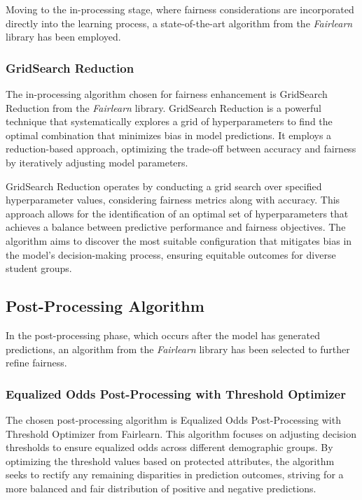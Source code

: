 \documentclass[12pt,a4paper,openright,twoside]{book}
\begin{document}
Moving to the in-processing stage, where fairness considerations are incorporated directly into the learning process, a state-of-the-art algorithm from the \emph{Fairlearn} library has been employed.

\subsubsection{GridSearch Reduction}

The in-processing algorithm chosen for fairness enhancement is GridSearch Reduction from the \emph{Fairlearn} library. GridSearch Reduction is a powerful technique that systematically explores a grid of hyperparameters to find the optimal combination that minimizes bias in model predictions. It employs a reduction-based approach, optimizing the trade-off between accuracy and fairness by iteratively adjusting model parameters.

GridSearch Reduction operates by conducting a grid search over specified hyperparameter values, considering fairness metrics along with accuracy. This approach allows for the identification of an optimal set of hyperparameters that achieves a balance between predictive performance and fairness objectives. The algorithm aims to discover the most suitable configuration that mitigates bias in the model's decision-making process, ensuring equitable outcomes for diverse student groups. \cite{agarwal2018reductions}

\subsection{Post-Processing Algorithm}

In the post-processing phase, which occurs after the model has generated predictions, an algorithm from the \emph{Fairlearn} library has been selected to further refine fairness.

\subsubsection{Equalized Odds Post-Processing with Threshold Optimizer}

The chosen post-processing algorithm is Equalized Odds Post-Processing with Threshold Optimizer from Fairlearn. This algorithm focuses on adjusting decision thresholds to ensure equalized odds across different demographic groups. By optimizing the threshold values based on protected attributes, the algorithm seeks to rectify any remaining disparities in prediction outcomes, striving for a more balanced and fair distribution of positive and negative predictions. \cite{10.5555/3157382.3157469}
\end{document}

